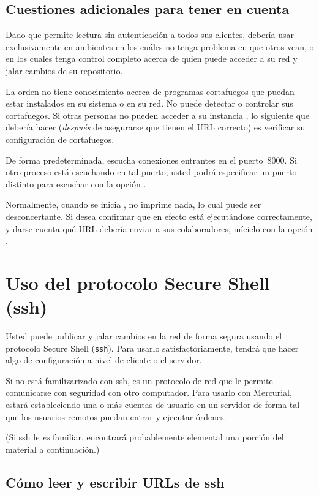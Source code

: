 \subsection{Cuestiones adicionales para tener en cuenta}

Dado que permite lectura sin autenticación a todos sus clientes,
debería usar  exclusivamente en ambientes en los cuáles
no tenga problema en que otros vean, o en los cuales tenga control
completo acerca de quien puede acceder a su red y jalar cambios de su
repositorio.

La orden  no tiene conocimiento acerca de programas
cortafuegos que puedan estar instalados en su sistema o en su red. No
puede detectar o controlar sus cortafuegos.  Si otras personas no
pueden acceder a su instancia , lo siguiente que debería hacer
(\emph{después} de asegurarse que tienen el URL correcto) es verificar
su configuración de cortafuegos.

De forma predeterminada,  escucha conexiones entrantes en
el puerto~8000.  Si otro proceso está escuchando en tal puerto, usted
podrá especificar un puerto distinto para escuchar con la opción
 .

Normalmente, cuando se inicia , no imprime nada, lo cual
puede ser desconcertante.  Si desea confirmar que en efecto está
ejecutándose correctamente, y darse cuenta qué URL debería enviar a
sus colaboradores, inícielo con la opción .

\section{Uso del protocolo Secure Shell (ssh)}
\label{sec:collab:ssh}

Usted puede publicar y jalar cambios en la red de forma segura usando
el protocolo Secure Shell (\texttt{ssh}).  Para usarlo satisfactoriamente,
tendrá que hacer algo de configuración a nivel de cliente o el
servidor.

Si no está familizarizado con ssh, es un protocolo de red que le permite
comunicarse con seguridad con otro computador.  Para usarlo con
Mercurial, estará estableciendo una o más cuentas de usuario en un
servidor de forma tal que los usuarios remotos puedan entrar y
ejecutar órdenes.

(Si ssh le \emph{es} familiar, encontrará probablemente elemental una
porción del material a continuación.)

\subsection{Cómo leer y escribir URLs de ssh}

